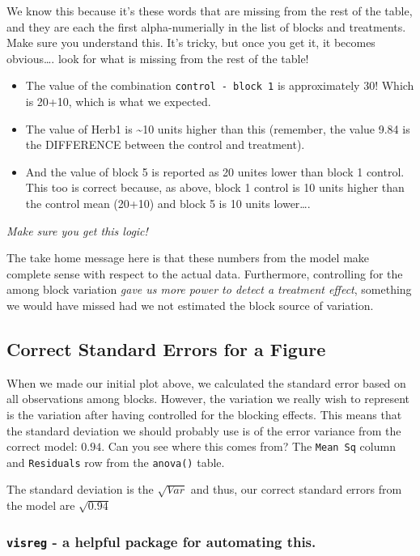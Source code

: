\documentclass[
]{book}
\providecommand{\tightlist}{%
  \setlength{\itemsep}{0pt}\setlength{\parskip}{0pt}}
\begin{document}
We know this because it's these words that are missing from the rest of the table, and they are each the first alpha-numerially in the list of blocks and treatments. Make sure you understand this. It's tricky, but once you get it, it becomes obvious\ldots. look for what is missing from the rest of the table!

\begin{itemize}
\tightlist
\item
  The value of the combination \texttt{control\ -\ block\ 1} is approximately 30! Which is 20+10, which is what we expected.
\item
  The value of Herb1 is \textasciitilde10 units higher than this (remember, the value 9.84 is the DIFFERENCE between the control and treatment).
\item
  And the value of block 5 is reported as 20 unites lower than block 1 control. This too is correct because, as above, block 1 control is 10 units higher than the control mean (20+10) and block 5 is 10 units lower\ldots.
\end{itemize}

\emph{Make sure you get this logic!}

The take home message here is that these numbers from the model make complete sense with respect to the actual data. Furthermore, controlling for the among block variation \emph{gave us more power to detect a treatment effect}, something we would have missed had we not estimated the block source of variation.

\subsection{Correct Standard Errors for a Figure}\label{correct-standard-errors-for-a-figure}

When we made our initial plot above, we calculated the standard error based on all observations among blocks. However, the variation we really wish to represent is the variation after having controlled for the blocking effects. This means that the standard deviation we should probably use is of the error variance from the correct model: \(0.94\). Can you see where this comes from? The \texttt{Mean\ Sq} column and \texttt{Residuals} row from the \texttt{anova()} table.

The standard deviation is the \(\sqrt{Var}\) and thus, our correct standard errors from the model are \(\sqrt{0.94}\)

\subsubsection{\texorpdfstring{\texttt{visreg} - a helpful package for automating this.}{visreg - a helpful package for automating this.}}\label{visreg---a-helpful-package-for-automating-this.}
\end{document}
